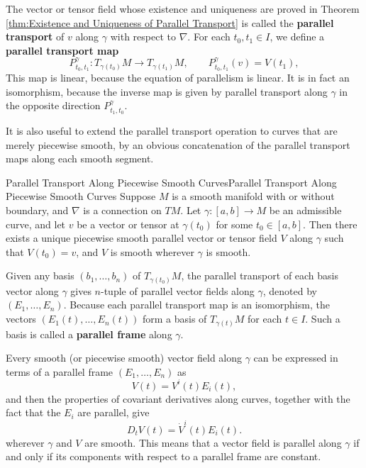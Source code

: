 \documentclass[../main.tex]{subfiles}
\begin{document}
The vector or tensor field whose existence and uniqueness are proved in Theorem \ref{thm:Existence and Uniqueness of Parallel Transport} is called the \textbf{parallel transport} of $v$ along $\gamma$ with respect to $\nabla$. For each $t_0, t_1 \in I$, we define a \textbf{parallel transport map}
\begin{equation}
	P_{t_0, t_1}^{\gamma}: T_{\gamma(t_0)} M \to T_{\gamma(t_1)} M, \qquad P_{t_0, t_1}^{\gamma}(v) = V(t_1),
\end{equation}
This map is linear, because the equation of parallelism is linear. It is in fact an isomorphism, because the inverse map is given by parallel transport along $\gamma$ in the opposite direction $P_{t_1, t_0}^{\gamma}$.

It is also useful to extend the parallel transport operation to curves that are merely piecewise smooth, by an obvious concatenation of the parallel transport maps along each smooth segment.

\begin{corollary}{Parallel Transport Along Piecewise Smooth Curves}{Parallel Transport Along Piecewise Smooth Curves}
	Suppose $M$ is a smooth manifold with or without boundary, and $\nabla$ is a connection on $TM$. Let $\gamma: [a,b] \to M$ be an admissible curve, and let $v$ be a vector or tensor at $\gamma(t_0)$ for some $t_0 \in [a,b]$. Then there exists a unique piecewise smooth parallel vector or tensor field $V$ along $\gamma$ such that $V(t_0) = v$, and $V$ is smooth wherever $\gamma$ is smooth.
\end{corollary}

Given any basis $(b_1, \ldots, b_n)$ of $T_{\gamma(t_0)} M$, the parallel transport of each basis vector along $\gamma$ gives $n$-tuple of parallel vector fields along $\gamma$, denoted by $(E_1, \ldots, E_n)$. Because each parallel transport map is an isomorphism, the vectors $(E_1(t), \ldots, E_n(t))$ form a basis of $T_{\gamma(t)} M$ for each $t \in I$. Such a basis is called a \textbf{parallel frame} along $\gamma$.

Every smooth (or piecewise smooth) vector field along $\gamma$ can be expressed in terms of a parallel frame $(E_1, \ldots, E_n)$ as
\begin{equation}
	V(t) = V^i(t) E_i(t),
\end{equation}
and then the properties of covariant derivatives along curves, together with the fact that the $E_i$ are parallel, give
\begin{equation}
	D_t V(t) = \dot{V}^i(t) E_i(t).
\end{equation}
wherever $\gamma$ and $V$ are smooth. This means that a vector field is parallel along $\gamma$ if and only if its components with respect to a parallel frame are constant.
\end{document}
